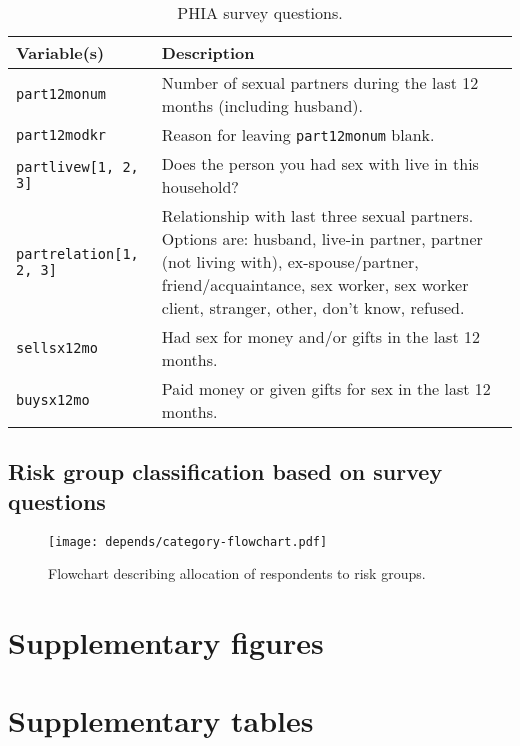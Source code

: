 \documentclass[
]{article}
\begin{document}
\begin{footnotesize}

\begin{table}[h]
\centering
\begin{tabularx}{\textwidth}{lX}
\toprule
Variable(s) & Description \\ 
 \midrule
\texttt{part12monum} & Number of sexual partners during the last 12 months (including husband). \\
\texttt{part12modkr} & Reason for leaving \texttt{part12monum} blank. \\
\texttt{partlivew[1, 2, 3]} & Does the person you had sex with live in this household? \\
\texttt{partrelation[1, 2, 3]} & Relationship with last three sexual partners. Options are: husband, live-in partner, partner (not living with), ex-spouse/partner, friend/acquaintance, sex worker, sex worker client, stranger, other, don't know, refused. \\
\texttt{sellsx12mo} & Had sex for money and/or gifts in the last 12 months. \\
\texttt{buysx12mo} & Paid money or given gifts for sex in the last 12 months. \\
\bottomrule
\end{tabularx}
\caption{PHIA survey questions.}
\end{table}

\end{footnotesize}

\newpage

\subsection{Risk group classification based on survey questions}

\begin{figure}[h!]
    \centering
    \texttt{[image: depends/category-flowchart.pdf]}
    \caption{Flowchart describing allocation of respondents to risk groups.}
    \label{fig:category-flowchart}
\end{figure}

\newpage

\hypertarget{supplementary-figures}{%
\section{Supplementary figures}\label{supplementary-figures}}

\newpage

\hypertarget{supplementary-tables}{%
\section{Supplementary tables}\label{supplementary-tables}}
\end{document}
